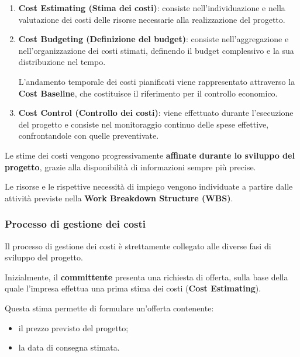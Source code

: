 \begin{enumerate}
    \item \textbf{Cost Estimating (Stima dei costi)}:
    consiste nell'individuazione e nella valutazione
    dei costi delle risorse necessarie alla realizzazione
    del progetto.

    \item \textbf{Cost Budgeting (Definizione del budget)}:
    consiste nell'aggregazione e nell'organizzazione
    dei costi stimati, definendo il budget complessivo
    e la sua distribuzione nel tempo.

    \noindent L'andamento temporale dei costi pianificati
    viene rappresentato attraverso la \textbf{Cost Baseline},
    che costituisce il riferimento per il controllo economico.

    \item \textbf{Cost Control (Controllo dei costi)}:
    viene effettuato durante l'esecuzione del progetto
    e consiste nel monitoraggio continuo delle spese effettive,
    confrontandole con quelle preventivate.
\end{enumerate}

\noindent Le stime dei costi vengono progressivamente
\textbf{affinate durante lo sviluppo del progetto},
grazie alla disponibilità di informazioni sempre più precise.

\medskip

\noindent Le risorse e le rispettive necessità di impiego
vengono individuate a partire dalle attività previste
nella \textbf{Work Breakdown Structure (WBS)}.

\subsubsection*{Processo di gestione dei costi}

\noindent Il processo di gestione dei costi è strettamente collegato
alle diverse fasi di sviluppo del progetto.

\medskip

\noindent Inizialmente, il \textbf{committente} presenta
una richiesta di offerta, sulla base della quale
l'impresa effettua una prima stima dei costi
(\textbf{Cost Estimating}).

\medskip

\noindent Questa stima permette di formulare
un'offerta contenente:

\begin{itemize}
    \item il prezzo previsto del progetto;
    \item la data di consegna stimata.
\end{itemize}

